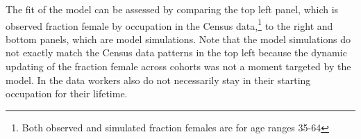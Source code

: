 \documentclass[11pt]{article}
\begin{document}




The fit of the model can be assessed by comparing the top left panel, which is observed fraction female by occupation in the Census data,\footnote{Both observed and simulated fraction females are for age ranges 35-64} to the right and bottom panels, which are model simulations. Note that the model simulations do not exactly match the Census data patterns in the top left because the dynamic updating of the fraction female across cohorts was not a moment targeted by the model. In the data workers also do not necessarily stay in their starting occupation for their lifetime.

\end{document}
